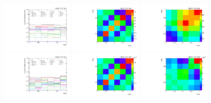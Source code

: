 \begin{refsection}
\begin{figure}[htb]
\begin{center}
 \includegraphics[width=0.32\textwidth]{fig_fullRun2UL/unfolding/combined/deltaSystCombinedlog_rebinnedB_ll_cHel.pdf}
 \includegraphics[width=0.32\textwidth]{fig_fullRun2UL/unfolding/combined/StatCovMatrix_rebinnedB_ll_cHel.pdf}
 \includegraphics[width=0.32\textwidth]{fig_fullRun2UL/unfolding/combined/TotalSystCovMatrix_rebinnedB_ll_cHel.pdf} \\
 \includegraphics[width=0.32\textwidth]{fig_fullRun2UL/unfolding/combined/deltaSystCombinedlogNorm_rebinnedB_ll_cHel.pdf}
 \includegraphics[width=0.32\textwidth]{fig_fullRun2UL/unfolding/combined/StatCovMatrixNorm_rebinnedB_ll_cHel.pdf}
 \includegraphics[width=0.32\textwidth]{fig_fullRun2UL/unfolding/combined/TotalSystCovMatrixNorm_rebinnedB_ll_cHel.pdf} \\

\end{center}
\end{figure}
\end{refsection}
